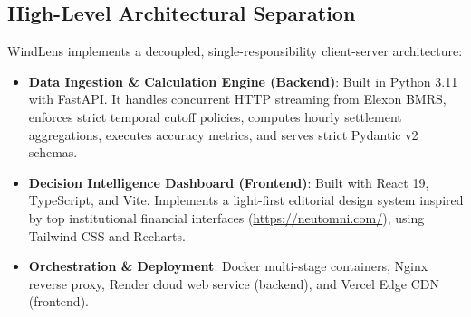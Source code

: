 \documentclass[11pt,a4paper]{article}
\begin{document}
\subsection{High-Level Architectural Separation}
WindLens implements a decoupled, single-responsibility client-server architecture:
\begin{itemize}[leftmargin=*]
    \item \textbf{Data Ingestion \& Calculation Engine (Backend)}: Built in Python 3.11 with FastAPI. It handles concurrent HTTP streaming from Elexon BMRS, enforces strict temporal cutoff policies, computes hourly settlement aggregations, executes accuracy metrics, and serves strict Pydantic v2 schemas.
    \item \textbf{Decision Intelligence Dashboard (Frontend)}: Built with React 19, TypeScript, and Vite. Implements a light-first editorial design system inspired by top institutional financial interfaces (\url{https://neutomni.com/}), using Tailwind CSS and Recharts.
    \item \textbf{Orchestration \& Deployment}: Docker multi-stage containers, Nginx reverse proxy, Render cloud web service (backend), and Vercel Edge CDN (frontend).
\end{itemize}
\end{document}
